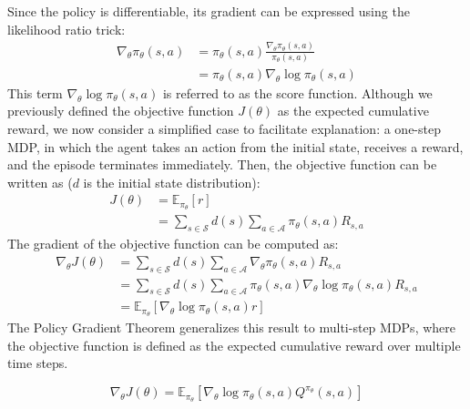 Since the policy is differentiable, its gradient can be expressed using the likelihood ratio trick:
\begin{equation}
  \begin{aligned}
    \nabla_\theta \pi_\theta(s, a)
    &= \pi_\theta(s, a) \frac{\nabla_\theta \pi_\theta(s, a)}{\pi_\theta(s, a)} \\
    &= \pi_\theta(s, a) \nabla_\theta \log \pi_\theta(s, a)
  \end{aligned}
\end{equation}
This term $\nabla_\theta \log \pi_\theta(s, a)$ is referred to as the score function.
Although we previously defined the objective function $J(\theta)$ as the expected cumulative reward, we now consider a simplified case to facilitate explanation: a one-step MDP, in which the agent takes an action from the initial state, receives a reward, and the episode terminates immediately.
Then, the objective function can be written as ($d$ is the initial state distribution):
\begin{equation}
  \begin{aligned}
    J(\theta)
    &= \mathbb{E}_{\pi_\theta}[r] \\
    &= \sum_{s \in \mathcal{S}} d(s) \sum_{a \in \mathcal{A}} \pi_\theta(s, a) R_{s ,a}
  \end{aligned}
\end{equation}
The gradient of the objective function can be computed as:
\begin{equation}
  \begin{aligned}
    \nabla_\theta J(\theta)
    &= \sum_{s \in \mathcal{S}} d(s) \sum_{a \in \mathcal{A}} \nabla_\theta \pi_\theta(s, a) R_{s, a} \\
    &= \sum_{s \in \mathcal{S}} d(s) \sum_{a \in \mathcal{A}} \pi_\theta(s, a) \nabla_\theta \log \pi_\theta(s, a) R_{s, a} \\
    &= \mathbb{E}_{\pi_\theta} [\nabla_\theta \log \pi_\theta(s, a) r]
  \end{aligned}
\end{equation}
The Policy Gradient Theorem generalizes this result to multi-step MDPs, where the objective function is defined as the expected cumulative reward over multiple time steps.
\begin{theorem}
  \begin{equation}
    \nabla_\theta J(\theta) = \mathbb{E}_{\pi_\theta}  [\nabla_\theta \log \pi_\theta(s, a) Q^{\pi_\theta}(s, a)]
  \end{equation}
\end{theorem}
